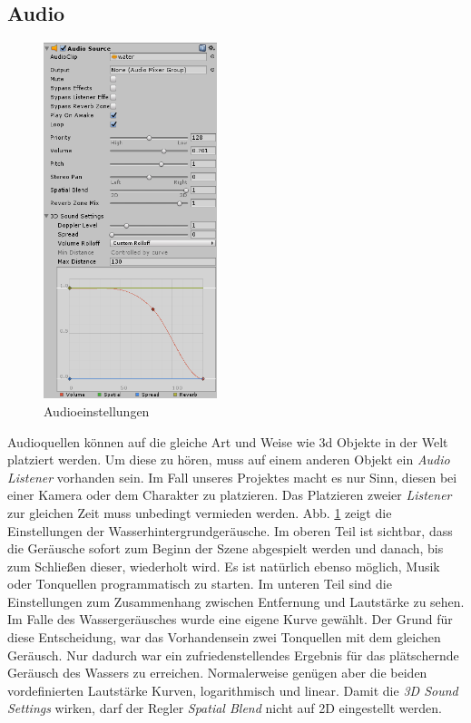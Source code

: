 \subsection{Audio}

\begin{figure}
	\vspace{-20pt}
	\begin{center}
		\includegraphics[width=0.45\textwidth]{Abbildungen/Unity/calmWaterAudio}
	\end{center}
	\caption{Audioeinstellungen}
	\label{fig:audioExample}
\end{figure}

Audioquellen können auf die gleiche Art und Weise wie 3d Objekte in der Welt platziert werden. Um diese zu hören, muss auf einem anderen Objekt ein \textit{Audio Listener} vorhanden sein. Im Fall unseres Projektes macht es nur Sinn, diesen bei einer Kamera oder dem Charakter zu platzieren. Das Platzieren zweier \textit{Listener} zur gleichen Zeit muss unbedingt vermieden werden. Abb. \ref{fig:audioExample} zeigt die Einstellungen der Wasserhintergrundgeräusche. Im oberen Teil ist sichtbar, dass die Geräusche sofort zum Beginn der Szene abgespielt werden und danach, bis zum Schließen dieser, wiederholt wird. Es ist natürlich ebenso möglich, Musik oder Tonquellen programmatisch zu starten. Im unteren Teil sind die Einstellungen zum Zusammenhang zwischen Entfernung und Lautstärke zu sehen. Im Falle des Wassergeräusches wurde eine eigene Kurve gewählt. Der Grund für diese Entscheidung, war das Vorhandensein zwei Tonquellen mit dem gleichen Geräusch. Nur dadurch war ein zufriedenstellendes Ergebnis für das plätschernde Geräusch des Wassers zu erreichen. Normalerweise genügen aber die beiden vordefinierten Lautstärke Kurven, logarithmisch und linear. Damit die \textit{3D Sound Settings} wirken, darf der Regler \textit{Spatial Blend} nicht auf 2D eingestellt werden.




 

